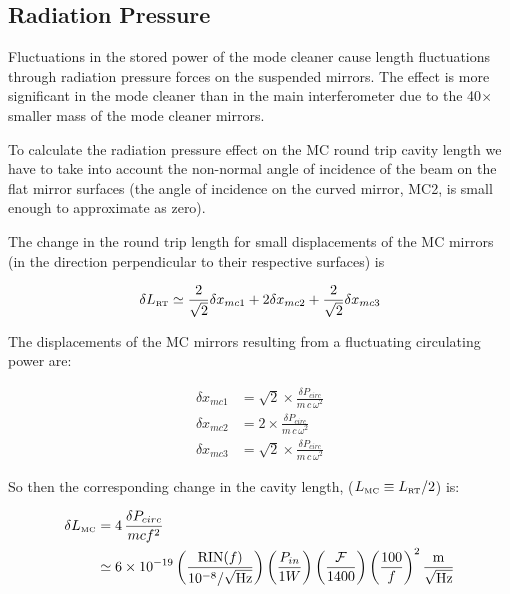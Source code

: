 \subsection{Radiation Pressure}
Fluctuations in the stored power of the mode cleaner cause length fluctuations
through radiation pressure forces on the suspended mirrors. The effect is more
significant in the mode cleaner than in the main interferometer due to the
40$\times$ smaller mass of the mode cleaner mirrors. 

To calculate the radiation pressure effect on the MC round trip cavity length
we have to take into account the non-normal angle of incidence of the beam on
the flat mirror surfaces (the angle of incidence on the curved mirror, MC2, is
small enough to approximate as zero).

The change in the round trip length for small displacements of the MC mirrors
(in the direction perpendicular to their respective surfaces) is

\begin{equation}
\delta L_{\mbox{\tiny RT}} \simeq \frac{2}{\sqrt{2}} \delta x_{mc1} + 
                                  2 \delta x_{mc2} + 
                                  \frac{2}{\sqrt{2}} \delta x_{mc3}
\end{equation}

The displacements of the MC mirrors resulting from a fluctuating circulating power
are:

\begin{alignat}
\delta x_{mc1} &= \sqrt{2} \times \frac{\delta P_{circ}}{m \, c \, \omega^2} \\
\delta x_{mc2} &= 2 \times \frac{\delta P_{circ}}{m \, c \, \omega^2} \\
\delta x_{mc3} &= \sqrt{2} \times \frac{\delta P_{circ}}{m \, c \, \omega^2}
\end{alignat}

So then the corresponding change in the cavity length,
($L_{\mbox{\tiny MC}} \equiv L_{\mbox{\tiny RT}}/2$) is:

\begin{equation}
\begin{aligned}
\delta L_{\mbox{\tiny MC}} &= 4 \, \frac{\delta P_{circ}}{m c f^2} \\
        &\simeq 6 \times 10^{-19}
             \left(\frac{\mbox{RIN}(f)}{10^{-8} /\sqrt{\mbox{Hz}}}\right)
             \left(\frac{P_{in}}{1 W}\right)
             \left(\frac{\mathcal{F}}{1400}\right)
             \left(\frac{100}{f}\right)^2
             \frac{\mbox{m}}{\sqrt{\mbox{Hz}}}
\end{aligned}
\end{equation}


